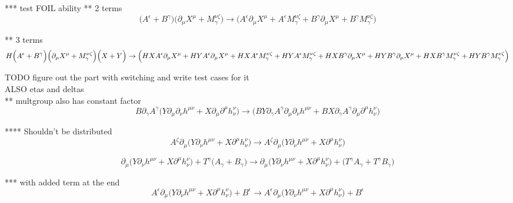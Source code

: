\documentclass{article}
\def\){\Big)}
\def\({\Big(}
\begin{document}
*** test FOIL ability
** 2 terms
\begin{equation}
\(A^{\epsilon} + B^{\gamma} \) \( \partial_{\mu}X^{\mu} + M^{\nu \zeta}_{\gamma} \) \rightarrow
\( A^{\epsilon} \partial_{\mu}X^{\mu} + A^{\epsilon} M_{\gamma}^{\nu \zeta} + B^{\gamma} \partial_{\mu}X^{\mu} + B^{\gamma} M_{\gamma}^{\nu \zeta} \)
\end{equation}


** 3 terms
\begin{equation}
H \(A^{\epsilon} + B^{\gamma} \) \( \partial_{\mu}X^{\mu} + M^{\nu \zeta}_{\gamma} \) \( X + Y\) \rightarrow
\(HX A^{\epsilon} \partial_{\mu}X^{\mu} +HY A^{\epsilon} \partial_{\mu}X^{\mu} +HX A^{\epsilon} M_{\gamma}^{\nu \zeta} +HY A^{\epsilon} M_{\gamma}^{\nu \zeta} +HX B^{\gamma} \partial_{\mu}X^{\mu} +HY B^{\gamma} \partial_{\mu}X^{\mu} +HX B^{\gamma} M_{\gamma}^{\nu \zeta} \\
+HY B^{\gamma} M_{\gamma}^{\nu \zeta} \)
\end{equation}

TODO figure out the part with switching and write test cases for it\\
ALSO etas and deltas\\
** multgroup also has constant factor\\
\begin{equation}
B \partial_{\gamma}A^{\gamma}  \(Y \partial_{\mu}\partial_{\nu}h^{\mu \nu} + X \partial_{\mu}\partial^{\mu} h^{\nu }_{\nu}\)  \rightarrow  \(BY \partial_{\gamma}A^{\gamma} \partial_{\mu}\partial_{\nu}h^{\mu \nu} +BX \partial_{\gamma}A^{\gamma} \partial_{\mu}\partial^{\mu}h_{\nu}^{\nu} \)
\end{equation}

**** Shouldn’t be distributed
\begin{equation}
A^{\zeta} \partial_{\mu}  \(Y \partial_{\nu}h^{\mu \nu} + X \partial^{\mu} h^{\nu }_{\nu}\) \rightarrow  A^{\zeta} \partial_{\mu}\(Y \partial_{\nu}h^{\mu \nu} +X \partial^{\mu}h_{\nu}^{\nu} \)
\end{equation}

\begin{equation}
 \partial_{\mu}  \(Y \partial_{\nu}h^{\mu \nu} + X \partial^{\mu} h^{\nu }_{\nu}\) +  T^{\gamma} \(A_{\gamma} + B_{\gamma}\) \rightarrow \partial_{\mu}\(Y \partial_{\nu}h^{\mu \nu} +X \partial^{\mu}h_{\nu}^{\nu} \)+\( T^{\gamma} A_{\gamma} + T^{\gamma} B_{\gamma} \)
\end{equation}

*** with added term at the end
\begin{equation}
A^{\epsilon} \partial_{\mu}  \(Y \partial_{\nu}h^{\mu \nu} + X \partial^{\mu} h^{\nu }_{\nu}\) + B^{\epsilon}  \rightarrow A^{\epsilon} \partial_{\mu}\(Y \partial_{\nu}h^{\mu \nu} +X \partial^{\mu}h_{\nu}^{\nu} \)+ B^{\epsilon}
\end{equation}
\end{document}
